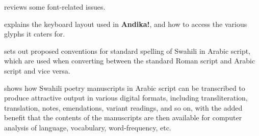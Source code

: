  reviews some font-related issues.

 explains the keyboard layout used in \textbf{Andika!}, and how to access the various glyphs it caters for.

 sets out proposed conventions for standard spelling of Swahili in Arabic script, which are used when converting between the standard Roman script and Arabic script and vice versa.

 shows how Swahili poetry manuscripts in Arabic script can be transcribed to produce attractive output in various digital formats, including transliteration, translation, notes, emendations, variant readings, and so on, with the added benefit that the contents of the manuscripts are then available for computer analysis of language, vocabulary, word-frequency, etc.
